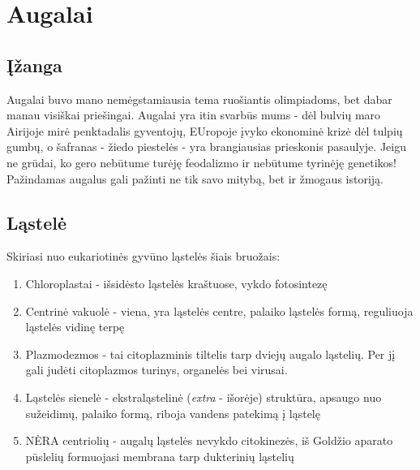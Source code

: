 \documentclass[]{book}
\providecommand{\tightlist}{%
  \setlength{\itemsep}{0pt}\setlength{\parskip}{0pt}}
\begin{document}
\hypertarget{augalai}{%
\chapter{Augalai}\label{augalai}}

\hypertarget{izanga-1}{%
\section{Įžanga}\label{izanga-1}}

Augalai buvo mano nemėgstamiausia tema ruošiantis olimpiadoms, bet dabar manau visiškai priešingai. Augalai yra itin svarbūs mums - dėl bulvių maro Airijoje mirė penktadalis gyventojų, EUropoje įvyko ekonominė krizė dėl tulpių gumbų, o šafranas - žiedo piestelės - yra brangiausias prieskonis pasaulyje. Jeigu ne grūdai, ko gero nebūtume turėję feodalizmo ir nebūtume tyrinėję genetikos! Pažindamas augalus gali pažinti ne tik savo mitybą, bet ir žmogaus istoriją.

\hypertarget{lastele}{%
\section{Ląstelė}\label{lastele}}

Skiriasi nuo eukariotinės gyvūno ląstelės šiais bruožais:

\begin{enumerate}
\def\labelenumi{\arabic{enumi}.}
\tightlist
\item
  Chloroplastai - išsidėsto ląstelės kraštuose, vykdo fotosintezę
\item
  Centrinė vakuolė - viena, yra ląstelės centre, palaiko ląstelės formą, reguliuoja ląstelės vidinę terpę
\item
  Plazmodezmos - tai citoplazminis tiltelis tarp dviejų augalo ląstelių. Per jį gali judėti citoplazmos turinys, organelės bei virusai.
\item
  Ląstelės sienelė - ekstraląstelinė (\emph{extra} - išorėje) struktūra, apsaugo nuo sužeidimų, palaiko formą, riboja vandens patekimą į ląstelę\\
\item
  NĖRA centriolių - augalų ląstelės nevykdo citokinezės, iš Goldžio aparato pūslelių formuojasi membrana tarp dukterinių ląstelių
\end{enumerate}
\end{document}

